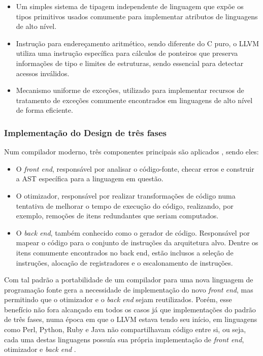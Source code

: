 \documentclass[
    12pt,                %
    openright,           %
    oneside,             %
    a4paper,             %
    english,             %
    brazil               %
]{abntex2}
\begin{document}
\begin{itemize}
\item
Um simples sistema de tipagem independente de linguagem que expõe os tipos primitivos usados comumente para implementar atributos de linguagens de alto nível.
\item 
Instrução para endereçamento aritmético, sendo diferente do C puro, o LLVM utiliza uma instrução específica para cálculos de ponteiros que preserva informações de tipo e limites de estruturas, sendo essencial para detectar acessos inválidos.
\item
Mecanismo uniforme de exceções, utilizado para implementar recursos de tratamento de exceções comumente encontrados em linguagens de alto nível de forma eficiente. 
\end{itemize}

\subsubsection{Implementação do Design de três fases}
\label{subsec:design_tres_fases}

Num compilador moderno, três componentes principais são aplicados \cite{Lattner2011}, sendo eles:

\begin{itemize}
\item
O \textit{front end}, responsável por analisar o código-fonte, checar erros e construir a AST específica para a linguagem em questão.
\item
O otimizador, responsável por realizar transformações de código numa tentativa de melhorar o tempo de execução do código, realizando, por exemplo, remoções de itens redundantes que seriam computados.
\item
O \textit{back end}, também conhecido como o gerador de código. Responsável por mapear o código para o conjunto de instruções da arquitetura alvo. Dentre os itens comumente encontrados no back end, estão inclusos a seleção de instruções, alocação de registradores e o escalonamento de instruções.
\end{itemize}

\par 
Com tal padrão a portabilidade de um compilador para uma nova linguagem de programação fonte gera a necessidade de implementação do novo \textit{front end}, mas permitindo que o otimizador e o \textit{back end} sejam reutilizados. 
Porém, esse benefício não fora alcançado em todos os casos já que implementações do padrão de três fases, numa época em que o LLVM estava tendo seu início, em linguagens como Perl, Python, Ruby e Java não 
compartilhavam código entre si, ou seja, cada uma destas linguagens possuía sua própria implementação de \textit{front end}, otimizador e \textit{back end} \cite{Lattner2011}.
\end{document}
